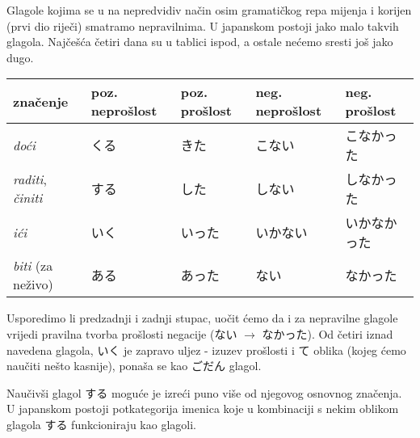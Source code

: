 
\author{Tomislav Mamić}

	
	
	Glagole kojima se u na nepredvidiv način osim gramatičkog repa mijenja i korijen (prvi dio riječi) smatramo nepravilnima. U japanskom postoji jako malo takvih glagola. Najčešća četiri dana su u tablici ispod, a ostale nećemo sresti još jako dugo.
	
	\begin{table}[h]
		\centering
		\begin{tabular}{l l l l l}\toprule[2pt]
			značenje & poz. neprošlost & poz. prošlost & neg. neprošlost & neg. prošlost\\
			\midrule
			\textit{doći} & くる & きた & こない & こなかった\\
			\textit{raditi}, \textit{činiti} & する & した & しない & しなかった\\
			\textit{ići} & いく & いった & いかない & いかなかった\\
			\textit{biti} (za neživo) & ある & あった & ない & なかった\\
			\bottomrule[2pt]
		\end{tabular}
	\end{table}

	Usporedimo li predzadnji i zadnji stupac, uočit ćemo da i za nepravilne glagole vrijedi pravilna tvorba prošlosti negacije (ない $\rightarrow$ なかった). Od četiri iznad navedena glagola, いく je zapravo uljez - izuzev prošlosti i て oblika (kojeg ćemo naučiti nešto kasnije), ponaša se kao ごだん glagol.
	
	
	Naučivši glagol する moguće je izreći puno više od njegovog osnovnog značenja. U japanskom postoji potkategorija imenica koje u kombinaciji s nekim oblikom glagola する funkcioniraju kao glagoli.
	
	\begin{reibun}
	\end{reibun}
	
